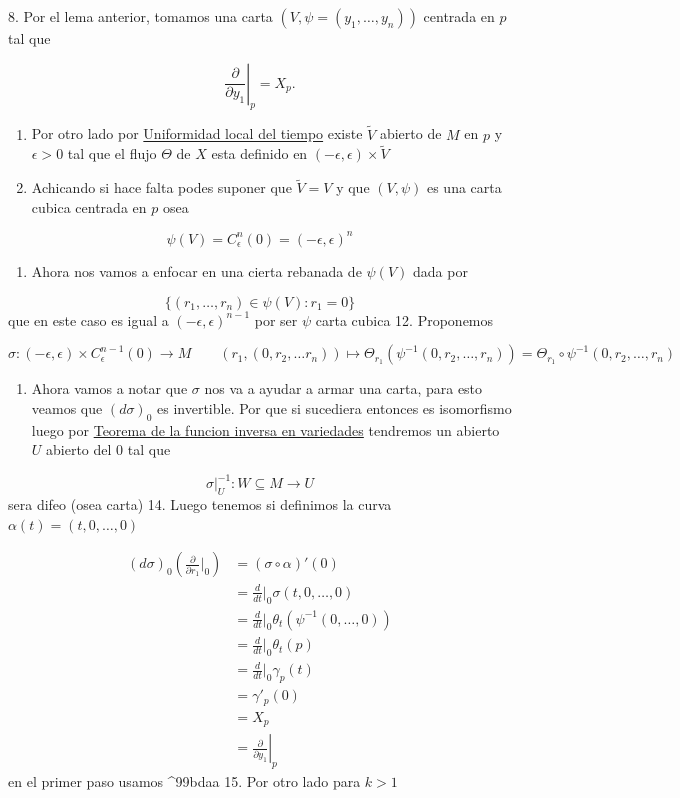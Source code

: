 \begin{bookproof}{}
8. Por el lema anterior, tomamos una carta $(V,\psi=(y_1,\ldots,y_n))$ centrada en $p$ tal que

\[
\left.\frac{\partial}{\partial y_1}\right|_p=X_p.
\]
\begin{enumerate}[start=9]
\item Por otro lado por \hyperref[blk:3b18e6]{Uniformidad local del tiempo} existe $\widetilde{V}$ abierto de $M$ en $p$ y $\epsilon>0$ tal que el flujo $\Theta$ de $X$ esta definido en $(-\epsilon,\epsilon)\times \widetilde{V}$
\item Achicando si hace falta podes suponer que $\widetilde{V}=V$ y que $(V,\psi)$ es una carta cubica centrada en $p$ osea
\end{enumerate}
\[
\psi(V)=C_{\epsilon}^{n} (0)=(-\epsilon,\epsilon)^{n}
\]
\begin{enumerate}[start=11]
\item Ahora nos vamos a enfocar en una cierta rebanada de $\psi(V)$ dada por
\end{enumerate}
\[
\{ (r_{1},\ldots,r_{n})\in \psi(V):r_{1}=0 \}
\]
que en este caso es igual a $(-\epsilon,\epsilon)^{n-1}$ por ser $\psi$ carta cubica 12. Proponemos

\[
\sigma:(-\epsilon,\epsilon)\times C_{\epsilon}^{n-1}(0)\rightarrow M\qquad (r_{1},(0,r_{2},\ldots r_{n}))\mapsto \Theta_{r_{1}}(\psi ^{-1}(0,r_{2},\ldots,r_{n}))=\Theta_{r_{1}}\circ\psi ^{-1}(0,r_{2},\ldots,r_{n})
\]
\begin{enumerate}[start=13]
\item Ahora vamos a notar que $\sigma$ nos va a ayudar a armar una carta, para esto veamos que $(d\sigma)_{0}$ es invertible. Por que si sucediera entonces es isomorfismo luego por \hyperref[blk:b664ba]{Teorema de la funcion inversa en variedades} tendremos un abierto $U$ abierto del $0$ tal que
\end{enumerate}
\[
\sigma|_{U}^{-1}:W\subseteq M\rightarrow U
\]
sera difeo (osea carta) 14. Luego tenemos si definimos la curva $\alpha (t)=(t,0,\ldots,0)$

\[
\begin{aligned}(d\sigma)_0\left(\frac{\partial}{\partial r_1}\bigg|_0\right)&=(\sigma\circ\alpha )'(0)\\&=\frac{d}{dt}\bigg|_0\sigma(t,0,\dots,0)\\&=\frac{d}{dt}\bigg|_0\theta_t(\psi^{-1}(0,\dots,0))\\&=\frac{d}{dt}\bigg|_0\theta_t(p)\\&=\frac{d}{dt}\bigg|_0\gamma_{p}(t)\\&=\gamma'_{p}(0)\\&=X_{p}\\&=\left.\frac{\partial}{\partial y_1}\right|_p\end{aligned}
\]
en el primer paso usamos \textasciicircum{}99bdaa 15. Por otro lado para $k>1$


\end{bookproof}
